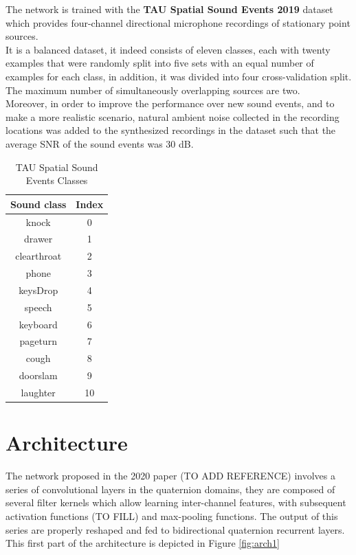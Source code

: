 \documentclass[11pt]{article}
\begin{document}
The network is trained with the \textbf{TAU Spatial Sound Events 2019} dataset which provides four-channel directional microphone recordings of stationary point sources.\\
It is a balanced dataset, it indeed consists of eleven classes, each with twenty examples that were randomly split into five sets with an equal number of examples for each class, in addition, it was divided into four cross-validation split.\\
The maximum number of simultaneously overlapping sources are two.\\
Moreover, in order to improve the performance over new sound events, and to make a more realistic scenario, natural ambient noise collected in the recording locations was added to the synthesized recordings in the dataset such that the average SNR of the sound events was 30 dB.

\begin{table}[ht]
	\caption{TAU Spatial Sound Events Classes}
	\centering
	\begin{tabular}{c c}
		\hline\hline
		Sound class & Index \\ [0.5ex]
		\hline
		knock & 0 \\
		drawer & 1 \\
		clearthroat & 2 \\
		phone & 3 \\
		keysDrop & 4 \\
		speech & 5 \\
		keyboard & 6 \\
		pageturn & 7 \\
		cough & 8 \\
		doorslam & 9 \\
		laughter & 10\\
		\hline		
	\end{tabular}
	\label{table:classes}
\end{table}


\section{Architecture}\label{cha:arch}

The network proposed in the 2020 paper (TO ADD REFERENCE) involves a series of convolutional layers in the quaternion domains, they are composed of several filter kernels which allow learning inter-channel features, with subsequent activation functions (TO FILL) and max-pooling functions. The output of this series are properly reshaped and fed to bidirectional quaternion recurrent layers. This first part of the architecture is depicted in Figure \ref{fig:arch1}
\end{document}
